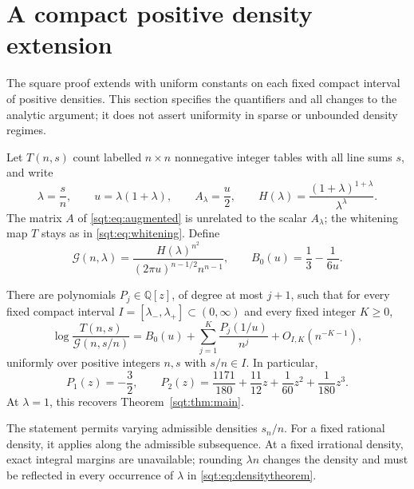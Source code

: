 \section{A compact positive density extension}\label{sqt:sec:density}
The square proof extends with uniform constants on each fixed compact interval of positive densities. This section specifies the quantifiers and all changes to the analytic argument; it does not assert uniformity in sparse or unbounded density regimes.

Let $T(n,s)$ count labelled $n\times n$ nonnegative integer tables with all line sums $s$, and write
\begin{equation}\label{sqt:eq:densitydefs}
\lambda=\frac{s}{n},\qquad u=\lambda(1+\lambda),\qquad A_\lambda=\frac u2,
\qquad H(\lambda)=\frac{(1+\lambda)^{1+\lambda}}{\lambda^\lambda}.
\end{equation}
The matrix $A$ of \eqref{sqt:eq:augmented} is unrelated to the scalar $A_\lambda$; the whitening map $T$ stays as in \eqref{sqt:eq:whitening}. Define
\begin{equation}\label{sqt:eq:densityG}
\mathcal G(n,\lambda)=\frac{H(\lambda)^{n^2}}
 {(2\pi u)^{n-1/2}n^{n-1}},\qquad
B_0(u)=\frac13-\frac1{6u}.
\end{equation}

\begin{theorem}\label{sqt:thm:density}
There are polynomials $P_j\in\mathbb Q[z]$, of degree at most $j+1$, such that for every fixed compact interval $I=[\lambda_-,\lambda_+]\subset(0,\infty)$ and every fixed integer $K\geq0$,
\begin{equation}\label{sqt:eq:densitytheorem}
\log\frac{T(n,s)}{\mathcal G(n,s/n)}
 =B_0(u)+\sum_{j=1}^K\frac{P_j(1/u)}{n^j}
   +O_{I,K}(n^{-K-1}),
\end{equation}
uniformly over positive integers $n,s$ with $s/n\in I$. In particular,
\begin{equation}\label{sqt:eq:densitypolys}
P_1(z)=-\frac32,\qquad
P_2(z)=\frac{1171}{180}+\frac{11}{12}z+\frac1{60}z^2+\frac1{180}z^3.
\end{equation}
At $\lambda=1$, this recovers Theorem~\ref{sqt:thm:main}.
\end{theorem}
The statement permits varying admissible densities $s_n/n$. For a fixed rational density, it applies along the admissible subsequence. At a fixed irrational density, exact integral margins are unavailable; rounding $\lambda n$ changes the density and must be reflected in every occurrence of $\lambda$ in \eqref{sqt:eq:densitytheorem}.

